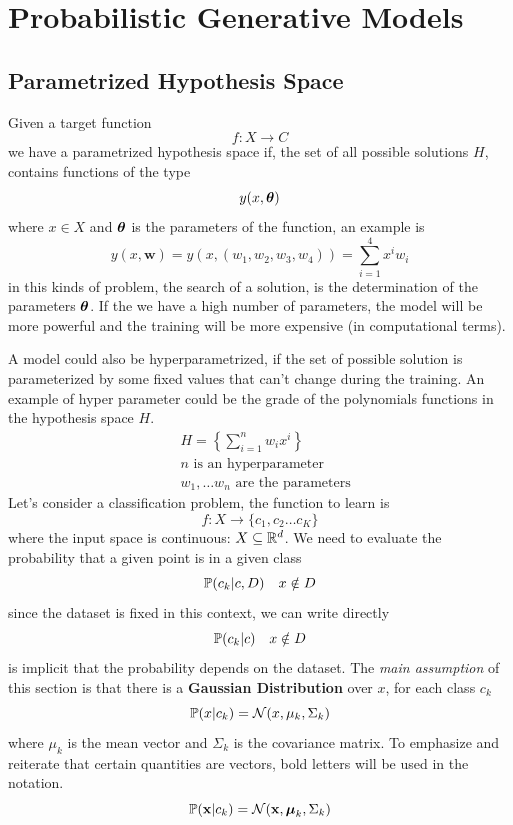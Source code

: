 \documentclass[10pt, letterpaper]{report}
\begin{document}
\section{Probabilistic Generative Models}
\subsection{Parametrized Hypothesis Space}
Given a target function
$$ f:X\rightarrow C $$
we have a parametrized hypothesis space if, the set of all possible solutions $H$, contains functions of the type
\begin{equation}
	y(x,{\boldsymbol{\theta}})
\end{equation}
where $x\in X$ and ${\boldsymbol{\theta}}$ is the parameters of the function, an example is\begin{equation}
	y(x,\mathbf w)=y(x,(w_1,w_2,w_3,w_4))=\sum_{i=1}^4x^iw_i
\end{equation}
in this kinds of problem, the search of a solution, is the determination of the parameters ${\boldsymbol{\theta}}$. If the we have a high number of parameters, the model will be more powerful and the training will be more expensive (in computational terms).

A model could also be hyperparametrized, if the set of possible solution is parameterized by some fixed values that can't change during the training. An example of hyper parameter could be the grade of the polynomials functions in the hypothesis space $H$.
\begin{align*}
	 & H=\left\{\sum_{i=1}^nw_ix^i\right\}     \\
	 & n\text{ is an hyperparameter}           \\
	 & w_1,\dots w_n\text{ are the parameters}
\end{align*}
Let's consider a classification problem, the function to learn is\begin{equation}
	f:X\rightarrow\{c_1,c_2\dots c_K\}
\end{equation}
where the input space is continuous: $X\subseteq{\mathbb R}^d$. We need to evaluate the probability that a given point is in a given class\begin{equation}
	{\mathbb P}(c_k|c,D) \ \ \ x\notin D
\end{equation}
since the dataset is fixed in this context, we can write directly \begin{equation}
	{\mathbb P}(c_k|c) \ \ \ x\notin D
\end{equation}
is implicit that the probability depends on the dataset. The \textit{main assumption} of this section is that there is a \textbf{Gaussian Distribution} over $x$, for each class $c_k$\begin{equation}
	{\mathbb P}(x|c_k)=\mathcal N(x,\mu_k,\Sigma_k)
\end{equation}
where $\mu_k$ is the mean vector and $\Sigma_k$ is the covariance matrix. To emphasize and reiterate that certain quantities are vectors, bold letters will be used in the notation.
\begin{equation}
	{\mathbb P}(\mathbf x|c_k)=\mathcal N(\mathbf  x,{\boldsymbol{\mu}}_k,\Sigma_k)
\end{equation}
\end{document}
